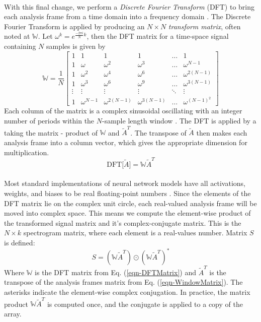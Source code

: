 \documentclass[12pt,letterpaper]{article}
\begin{document}
\paragraph*{}With this final change, we perform a \textit{Discrete Fourier Transform} (DFT) to bring each analysis frame from a time domain into a frequency domain \cite{Olson,Peatross,Virtanen}. The Discrete Fourier Transform is applied by producing an $N \times N$ \textit{transform matrix}, often noted at $\mathbb{W}$. Let $\omega^k = e^{\frac{-2\pi i}{N}k}$, then the DFT matrix for a time-space signal containing $N$ samples is given by \cite{Taylor,Virtanen}
\begin{equation}
\label{eqn-DFTMatrix}
\mathbb{W} = \frac{1}{N}
\begin{bmatrix}
1 & 1 & 1 & 1 & \hdots & 1 \\
1 & \omega		& \omega^2 & \omega^3 & \hdots & \omega^{N-1} \\
1 & \omega^2	& \omega^4 & \omega^6 & \hdots & \omega^{2(N-1)} \\
1 & \omega^3	& \omega^6 & \omega^9 & \hdots & \omega^{3(N-1)} \\
\vdots & \vdots & \vdots & \vdots & \ddots & \vdots \\
1 & \omega^{N-1} & \omega^{2(N-1)} & \omega^{3(N-1)} & \hdots & \omega^{(N-1)^2}
\end{bmatrix}
\end{equation}
Each column of the matrix is a complex sinusoidal oscillating with an integer number of periods within the $N$-sample length window \cite{Short,Peatross}. The DFT is applied by a taking the matrix - product of $\mathbb{W}$ and $\widetilde{A}^T$. The transpose of $\widetilde{A}$ then makes each analysis frame into a column vector, which gives the appropriate dimension for multiplication.
\begin{equation}
\label{eqn-DFT}
\text{DFT}\big[ \widetilde{A} \big] = \mathbb{W}\widetilde{A}^T
\end{equation}

\paragraph*{}Most standard implementations of neural network models have all activations, weights, and biases to be real floating-point numbers \cite{Levine,Loy,Tensorflow}. Since the elements of the DFT matrix lie on the complex unit circle, each real-valued analysis frame will be moved into complex space. This means we compute the element-wise product of the transformed signal matrix and it's complex-conjugate matrix. This is the $N \times k$
spectrogram matrix, where each element is a real-values number. Matrix $S$ is defined:
\begin{equation}
\label{eqn-Spectrogram}
S = (\mathbb{W}\widetilde{A}^T) \odot (\mathbb{W}\widetilde{A}^T)^*
\end{equation}
Where $\mathbb{W}$ is the DFT matrix from Eq. (\ref{eqn-DFTMatrix}) and $\widetilde{A}^T$ is the transpose of the analysis frames matrix from Eq. (\ref{eqn-WindowMatrix}). The asterisks indicate the element-wise complex conjugation. In practice, the matrix product $\mathbb{W}\widetilde{A}^T$ is computed once, and the conjugate is applied to a copy of the array.
\end{document}
